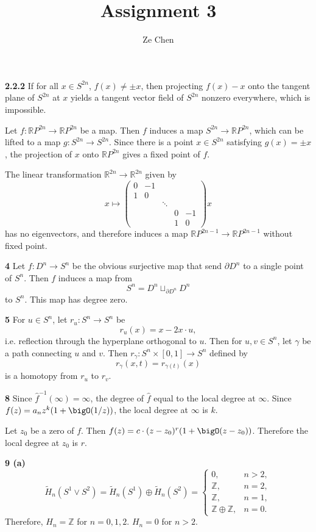 \documentclass{article}
\title{Assignment 3}
\author{Ze Chen}
\makeatletter
\newcommand*{\shifttext}[1]{%
  \settowidth{\@tempdima}{#1}%
  \hspace{-\@tempdima}#1%
}
\newcommand{\plabel}[1]{%
\shifttext{\textbf{#1}\quad}%
}
\newcommand{\minusbaseline}{\abovedisplayskip=0pt\abovedisplayshortskip=0pt~\vspace*{-\baselineskip}}%
\makeatother
\begin{document}
\maketitle

\plabel{2.2.2}%
If for all $x\in S^{2n}$, $f(x)\neq \pm x$, then projecting $f(x) - x$ onto the tangent plane of $S^{2n}$ at $x$ yields a tangent vector field of $S^{2n}$ nonzero everywhere, which is impossible.
\par
Let $f:\mathbb{R}P^{2n} \rightarrow \mathbb{R}P^{2n}$ be a map.
Then $f$ induces a map $S^{2n} \rightarrow \mathbb{R}P^{2n}$, which can be lifted to a map $g:S^{2n} \rightarrow S^{2n}$.
Since there is a point $x\in S^{2n}$ satisfying $g(x) = \pm x$, the projection of $x$ onto $\mathbb{R}P^{2n}$ gives a fixed point of $f$.
\par
The linear transformation $\mathbb{R}^{2n} \rightarrow \mathbb{R}^{2n}$ given by
\[ x \mapsto \begin{pmatrix}
    0 & -1 & & & \\
    1 &  0 & & & \\
      &    & \ddots & & \\
      & & & 0 & -1 \\
      & & & 1 & 0
\end{pmatrix}x \]
has no eigenvectors, and therefore induces a map $\mathbb{R}P^{2n-1} \rightarrow \mathbb{R}P^{2n-1}$ without fixed point.

\plabel{4}%
Let $f:D^n \rightarrow S^n$ be the obvious surjective map that send $\partial D^n$ to a single point of $S^n$.
Then $f$ induces a map from
\[ S^n = D^n \sqcup_{\partial D^n} D^n \]
to $S^n$.
This map has degree zero.

\plabel{5}%
For $u\in S^n$, let $r_u:S^n \rightarrow S^n$ be
\[ r_u(x) = x - 2 x\cdot u, \]
i.e. reflection through the hyperplane orthogonal to $u$.
Then for $u,v\in S^n$, let $\gamma$ be a path connecting $u$ and $v$.
Then $r_\gamma: S^n \times [0,1] \rightarrow S^n$ defined by
\[ r_\gamma(x,t) = r_{\gamma(t)}(x) \]
is a homotopy from $r_u$ to $r_v$.

\plabel{8}%
Since $\hat{f}^{-1}(\infty) = \infty$, the degree of $\hat{f}$ equal to the local degree at $\infty$.
Since $f(z) = a_n z^k (1+\bigO(1/z))$, the local degree at $\infty$ is $k$.
\par
Let $z_0$ be a zero of $f$. Then $f(z) = c \cdot (z-z_0)^r (1 + \bigO(z-z_0))$.
Therefore the local degree at $z_0$ is $r$.

\plabel{9 (a)}%
\begingroup\minusbaseline
\[ \tilde{H}_n(S^1 \vee S^2) = \tilde{H}_n(S^1) \oplus \tilde{H}_n(S^2) = \begin{cases}
    0, & n>2,\\
    \mathbb{Z},& n=2, \\
    \mathbb{Z},& n=1, \\
    \mathbb{Z}\oplus \mathbb{Z}, & n=0.
\end{cases} \]
\endgroup
Therefore, $H_n = \mathbb{Z}$ for $n=0,1,2$.
$H_n = 0$ for $n>2$.
\end{document}
